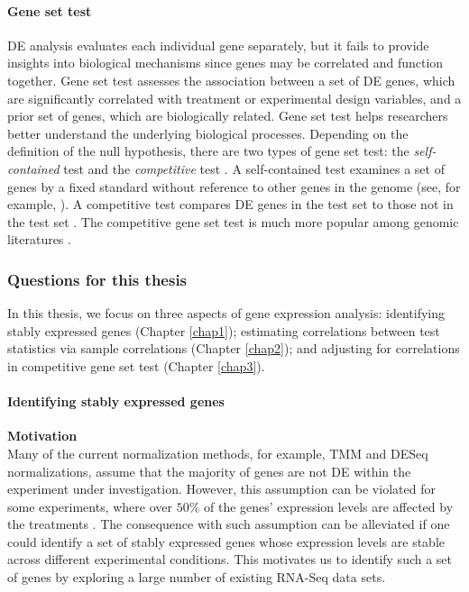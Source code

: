 	\paragraph*{Gene set test}
		 DE analysis evaluates each individual gene separately, but it fails to provide insights into biological mechanisms since genes may be correlated and function together. Gene set test assesses the association between a set of DE genes, which are significantly correlated with treatment or experimental design variables, and a prior set of genes, which are biologically related.  Gene set test helps researchers better understand the underlying biological processes. Depending on the definition of the null hypothesis, there are two types of gene set test: the \textit{self-contained} test and the \textit{competitive} test \citep{goeman2007analyzing}. A self-contained test examines a set of genes by a fixed standard without reference to other genes in the genome (see, for example, \cite{goeman2004global,goeman2005testing, tsai2009multivariate, wu2010roast, huang2013gene}). A competitive test compares DE
		 genes in the test set to those not in the test set \citep{tian2005discovering, wu2012camera, yaari2013quantitative}. The competitive gene set test is much more popular among genomic literatures \citep{goeman2007analyzing, gatti2010heading}.  
		 
	
	

	\subsubsection{Questions for this thesis}
	 In this thesis, we focus on three aspects of gene expression analysis: identifying stably expressed genes (Chapter \ref{chap1}); estimating correlations between test statistics via sample correlations (Chapter \ref{chap2}); and adjusting for correlations in competitive gene set test (Chapter \ref{chap3}).
	
	\paragraph{Identifying stably expressed genes}
	\textbf{Motivation} \\
	Many of the current normalization methods, for example, TMM \citep{robinson2010scaling} and DESeq \citep{anders2010differential} normalizations, assume that the majority of genes are not DE within the experiment under investigation. However, this assumption can be violated for some experiments, where over $50\%$ of the genes' expression levels are affected by the treatments \citep{loven2012revisiting, wu2013use}. The consequence with such assumption can be alleviated if one could identify a set of stably expressed genes whose expression levels are stable across different experimental conditions. This motivates us to identify such a set of genes by exploring a large number of existing RNA-Seq data sets.
	
